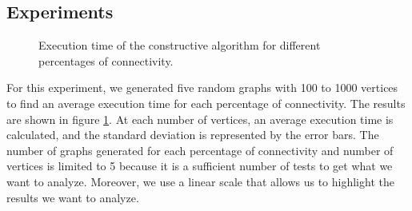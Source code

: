 
\subsection{Experiments}

\begin{figure}[H]
    \centering
    \caption{Execution time of the constructive algorithm for different percentages of connectivity.}
    \label{fig:constructive_time}
\end{figure}

For this experiment, we generated five random graphs with 100 to 1000 vertices to find an average execution time for each percentage of connectivity. The results are shown in figure \ref{fig:constructive_time}. At each number of vertices, an average execution time is calculated, and the standard deviation is represented by the error bars. The number of graphs generated for each percentage of connectivity and number of vertices is limited to 5 because it is a sufficient number of tests to get what we want to analyze. Moreover, we use a linear scale that allows us to highlight the results we want to analyze.